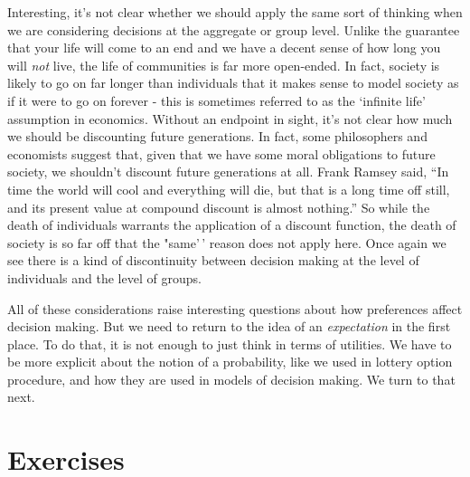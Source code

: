 \documentclass[]{tufte-book}
\begin{document}
Interesting, it's not clear whether we should apply the same sort of thinking when we are considering decisions at the aggregate or group level. Unlike the guarantee that your life will come to an end and we have a decent sense of how long you will \emph{not} live, the life of communities is far more open-ended. In fact, society is likely to go on far longer than individuals that it makes sense to model society as if it were to go on forever - this is sometimes referred to as the `infinite life' assumption in economics. Without an endpoint in sight, it's not clear how much we should be discounting future generations. In fact, some philosophers and economists suggest that, given that we have some moral obligations to future society, we shouldn't discount future generations at all. Frank Ramsey said, ``In time the world will cool and everything will die, but that is a long time off still, and its present value at compound discount is almost nothing.'' So while the death of individuals warrants the application of a discount function, the death of society is so far off that the "same'\,' reason does not apply here. Once again we see there is a kind of discontinuity between decision making at the level of individuals and the level of groups.

All of these considerations raise interesting questions about how preferences affect decision making. But we need to return to the idea of an \emph{expectation} in the first place. To do that, it is not enough to just think in terms of utilities. We have to be more explicit about the notion of a probability, like we used in lottery option procedure, and how they are used in models of decision making. We turn to that next.

\hypertarget{exercises-3}{%
\section*{Exercises}\label{exercises-3}}
\end{document}
